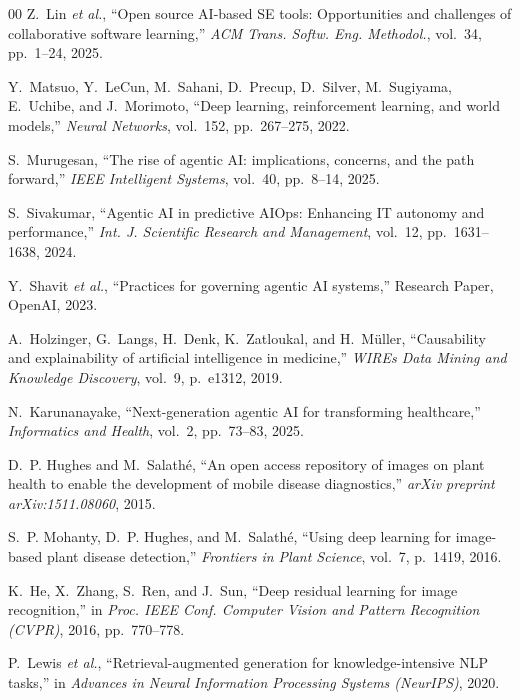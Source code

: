 \documentclass[conference]{IEEEtran}
\begin{document}
\begin{thebibliography}{00}
 Z.~Lin \emph{et al.}, ``Open source AI-based SE tools: Opportunities and challenges of collaborative software learning,'' \emph{ACM Trans. Softw. Eng. Methodol.}, vol.~34, pp.~1--24, 2025.

 Y.~Matsuo, Y.~LeCun, M.~Sahani, D.~Precup, D.~Silver, M.~Sugiyama, E.~Uchibe, and J.~Morimoto, ``Deep learning, reinforcement learning, and world models,'' \emph{Neural Networks}, vol.~152, pp.~267--275, 2022.

 S.~Murugesan, ``The rise of agentic AI: implications, concerns, and the path forward,'' \emph{IEEE Intelligent Systems}, vol.~40, pp.~8--14, 2025.

 S.~Sivakumar, ``Agentic AI in predictive AIOps: Enhancing IT autonomy and performance,'' \emph{Int. J. Scientific Research and Management}, vol.~12, pp.~1631--1638, 2024.

 Y.~Shavit \emph{et al.}, ``Practices for governing agentic AI systems,'' Research Paper, OpenAI, 2023.

 A.~Holzinger, G.~Langs, H.~Denk, K.~Zatloukal, and H.~M\"uller, ``Causability and explainability of artificial intelligence in medicine,'' \emph{WIREs Data Mining and Knowledge Discovery}, vol.~9, p.~e1312, 2019.

 N.~Karunanayake, ``Next-generation agentic AI for transforming healthcare,'' \emph{Informatics and Health}, vol.~2, pp.~73--83, 2025.

 D.~P. Hughes and M.~Salath\'e, ``An open access repository of images on plant health to enable the development of mobile disease diagnostics,'' \emph{arXiv preprint arXiv:1511.08060}, 2015.

 S.~P. Mohanty, D.~P. Hughes, and M.~Salath\'e, ``Using deep learning for image-based plant disease detection,'' \emph{Frontiers in Plant Science}, vol.~7, p.~1419, 2016.

 K.~He, X.~Zhang, S.~Ren, and J.~Sun, ``Deep residual learning for image recognition,'' in \emph{Proc. IEEE Conf. Computer Vision and Pattern Recognition (CVPR)}, 2016, pp.~770--778.

 P.~Lewis \emph{et al.}, ``Retrieval-augmented generation for knowledge-intensive NLP tasks,'' in \emph{Advances in Neural Information Processing Systems (NeurIPS)}, 2020.

\end{thebibliography}
\end{document}
